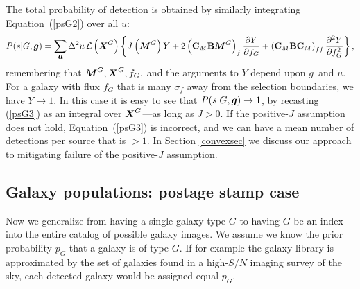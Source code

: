 \documentclass[11pt,preprint,flushrt]{aastex}
\def\eqq#1{Equation~(\ref{#1})}
\newcommand{\vecX}{\mbox{\boldmath $X$}}
\newcommand{\vecg}{\mbox{\boldmath $g$}}
\newcommand{\vecM}{\mbox{\boldmath $M$}}
\newcommand{\vecu}{\mbox{\boldmath $u$}}
\newcommand{\matC}{\mbox{$\bf C$}}
\newcommand{\matB}{\mbox{$\bf B$}}
\newcommand{\likeli}{\mbox{$\mathcal{L}$}}
\newcommand\edit[1]{#1}
\begin{document}
The total probability of detection is obtained by similarly
integrating \eqq{psG2} over all \vecu:
\begin{equation}
\label{psG3}
P(s | G, \vecg) = \sum_{\vecu} \Delta^2u \, \likeli\left(\vecX^G\right) \left\{
 J\left(\vecM^G\right) Y + 2\left(\matC_M \matB \vecM^G\right)_f \frac{\partial
  Y}{\partial f_G}
+ \left(\matC_M \matB \matC_M\right)_{ff} 
\frac{\partial^2
  Y}{\partial f_G^2} \right\},
\end{equation}
remembering that $\vecM^G, \vecX^G, f_G,$ and the arguments to $Y$
depend upon \vecg\ and \vecu.  For
a galaxy with flux $f_G$ that is many $\sigma_f$ away from the
selection boundaries, we have $Y\rightarrow 1$.  In this case it is
easy to see that $P(s | G,\vecg)\rightarrow 1$, by recasting (\ref{psG3}) as
an integral over $\vecX^G$---as long as $J>0$.  If the positive-$J$
assumption does not hold, \eqq{psG3} is incorrect, and
we can have a mean number of detections per
source that is $>1$.  In Section \ref{convexsec} we discuss our approach to
mitigating failure of the positive-$J$ assumption.

\subsection{Galaxy populations: postage stamp case}
\label{stampsec}
Now we generalize from having a single galaxy type $G$ to having $G$
be an index into the entire catalog of possible galaxy images.
\edit{We assume we know the prior probability $p_G$ that a galaxy is
  of type $G$.  If for example the galaxy library is approximated by
  the set of galaxies found in a high-$S/N$ imaging survey of the sky,
  each detected galaxy would be assigned equal $p_G$.}
\end{document}
